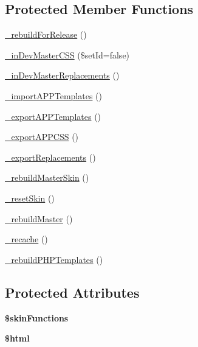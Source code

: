 \subsection*{Protected Member Functions}
\begin{DoxyCompactItemize}
\item 
\hyperlink{classadmin__core__templates__tools_a476d69076e04bb5aaca67f12da23dcef}{\-\_\-rebuild\-For\-Release} ()
\item 
\hyperlink{classadmin__core__templates__tools_afce040fe4575c4e63d4c63284e6bc187}{\-\_\-in\-Dev\-Master\-C\-S\-S} (\$set\-Id=false)
\item 
\hyperlink{classadmin__core__templates__tools_ae31b76bf0ee06014f362104230ff2175}{\-\_\-in\-Dev\-Master\-Replacements} ()
\item 
\hyperlink{classadmin__core__templates__tools_ad95dd43e542ad6997b3d0728f7a0f73e}{\-\_\-import\-A\-P\-P\-Templates} ()
\item 
\hyperlink{classadmin__core__templates__tools_aefd3500a488133a22e7451a8a5e7aec5}{\-\_\-export\-A\-P\-P\-Templates} ()
\item 
\hyperlink{classadmin__core__templates__tools_ad537d3b4dc9d458e948eb9464e3d274a}{\-\_\-export\-A\-P\-P\-C\-S\-S} ()
\item 
\hyperlink{classadmin__core__templates__tools_a2cb3414bf59dc280dd115b1644d5b6ba}{\-\_\-export\-Replacements} ()
\item 
\hyperlink{classadmin__core__templates__tools_a5e3a66cbf8f6c550e33ef6838beaa97a}{\-\_\-rebuild\-Master\-Skin} ()
\item 
\hyperlink{classadmin__core__templates__tools_abfa69c61efe39f6337e3e4ed9f7f036a}{\-\_\-reset\-Skin} ()
\item 
\hyperlink{classadmin__core__templates__tools_a74e392ee51aa049c61a31cb2a856ad24}{\-\_\-rebuild\-Master} ()
\item 
\hyperlink{classadmin__core__templates__tools_a85a0af651ace606800023a8893e263d8}{\-\_\-recache} ()
\item 
\hyperlink{classadmin__core__templates__tools_a1ead829bb3fd146095559984aba8a0cf}{\-\_\-rebuild\-P\-H\-P\-Templates} ()
\end{DoxyCompactItemize}
\subsection*{Protected Attributes}
\begin{DoxyCompactItemize}
\item 
\hypertarget{classadmin__core__templates__tools_a41d90687021c6f16184b43666509dee8}{{\bfseries \$skin\-Functions}}\label{classadmin__core__templates__tools_a41d90687021c6f16184b43666509dee8}

\item 
\hypertarget{classadmin__core__templates__tools_a6f96e7fc92441776c9d1cd3386663b40}{{\bfseries \$html}}\label{classadmin__core__templates__tools_a6f96e7fc92441776c9d1cd3386663b40}

\end{DoxyCompactItemize}


